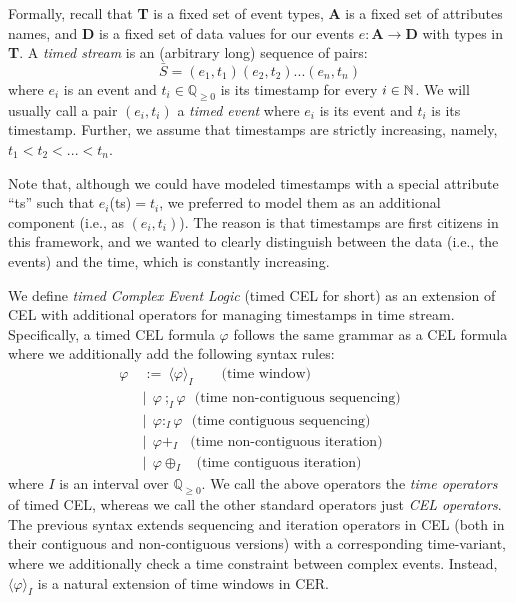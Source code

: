 Formally, recall that \textbf{T} is a fixed set of event types, \textbf{A} is a fixed set of attributes names, and \textbf{D} is a fixed set of data values for our events $e:\textbf{A}\rightarrow\textbf{D}$ with types in \textbf{T}.
A \textit{timed stream} is an (arbitrary long) sequence of pairs: 
$$\bar{S}=(e_1,t_1)(e_2,t_2)...(e_n,t_n)$$
where $e_i$ is an event and $t_i\in\mathbb{Q}_{\geq0}$ is its timestamp for every $i\in\mathbb{N}$.
We will usually call a pair $(e_i,t_i)$ a \textit{timed event} where $e_i$ is its event and $t_i$ is its timestamp. 
Further, we assume that timestamps are strictly increasing, namely, $t_1<t_2<...<t_n$.

Note that, although we could have modeled timestamps with a special attribute ``ts'' such that $e_i$(ts)$=t_i$, we preferred to model them as an additional component (i.e., as $(e_i,t_i)$).
The reason is that timestamps are first citizens in this framework, and we wanted to clearly distinguish between the data (i.e., the events) and the time, which is constantly increasing.

We define \textit{timed Complex Event Logic} (timed CEL for short) as an extension of CEL with additional operators for managing timestamps in time stream. Specifically, a timed CEL formula $\varphi$ follows the same grammar as a CEL formula where we additionally add the following syntax rules:
\begin{align*}
    \varphi\ &{:=} \  \langle\varphi\rangle_I \quad\quad  \text{(time window)}\\
    &\mid \ \  \varphi\ ;_I \varphi \ \ \ \text{(time non-contiguous sequencing)} \\
    &\mid \ \ \varphi :_I \varphi \ \ \ \text{(time contiguous sequencing)} \\
    &\mid \ \ \varphi+_I \ \ \ \ \text{(time non-contiguous iteration)} \\
    &\mid \ \ \varphi\oplus_I \ \ \ \  \text{(time contiguous iteration)}
\end{align*}
where $I$ is an interval over $\mathbb{Q}_{\geq0}$.
We call the above operators the \textit{time operators} of timed CEL, whereas we call the other standard operators just \textit{CEL operators}.
The previous syntax extends sequencing and iteration operators in CEL (both in their contiguous and non-contiguous versions) with a corresponding time-variant, where we additionally check a time constraint between complex events. 
Instead, $\langle\varphi\rangle_I$ is a natural extension of time windows in CER.

